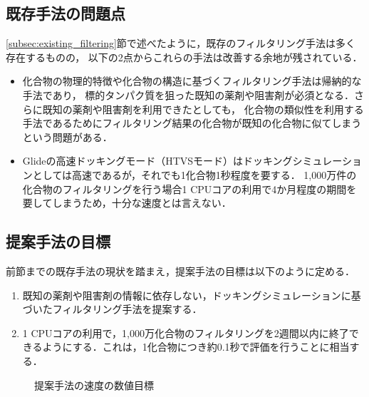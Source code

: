 \subsection{既存手法の問題点}
\ref{subsec:existing_filtering}節で述べたように，既存のフィルタリング手法は多く存在するものの，
以下の2点からこれらの手法は改善する余地が残されている．
\begin{itemize}
\item 化合物の物理的特徴や化合物の構造に基づくフィルタリング手法は帰納的な手法であり，
	標的タンパク質を狙った既知の薬剤や阻害剤が必須となる．さらに既知の薬剤や阻害剤を利用できたとしても，
	化合物の類似性を利用する手法であるためにフィルタリング結果の化合物が既知の化合物に似てしまうという問題がある．	
\item Glideの高速ドッキングモード（HTVSモード）はドッキングシミュレーションとしては高速であるが，それでも1化合物1秒程度を要する．
	1,000万件の化合物のフィルタリングを行う場合1 CPUコアの利用で4か月程度の期間を要してしまうため，十分な速度とは言えない．
\end{itemize}

\subsection{提案手法の目標}
前節までの既存手法の現状を踏まえ，提案手法の目標は以下のように定める．
\begin{enumerate}
\item 既知の薬剤や阻害剤の情報に依存しない，ドッキングシミュレーションに基づいたフィルタリング手法を提案する．
\item 1 CPUコアの利用で，1,000万化合物のフィルタリングを2週間以内に終了できるようにする．これは，1化合物につき約0.1秒で評価を行うことに相当する．
\end{enumerate}

\begin{figure}[tb]
 \begin{center}
  \caption{提案手法の速度の数値目標}
  \label{fig:proposal_aim}
 \end{center}
\end{figure}
